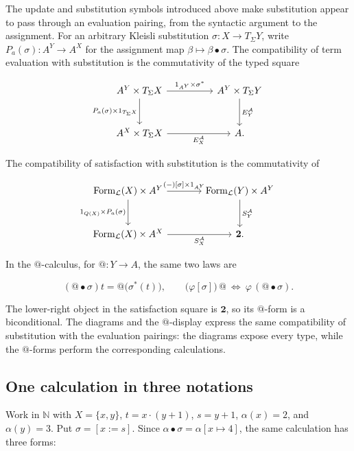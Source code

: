 \documentclass[11pt]{article}
\makeatletter
\newcommand{\atsign}{\mathord{@}}
\makeatother
\begin{document}
The update and substitution symbols introduced above make substitution appear
to pass through an evaluation pairing, from the syntactic argument to the
assignment. For an arbitrary Kleisli substitution
$\sigma:X\to T_\Sigma Y$, write
$P_a(\sigma):A^Y\to A^X$ for the assignment map
$\beta\mapsto\beta\bullet\sigma$. The compatibility of term evaluation with
substitution is the commutativity of the typed square

\[
\begin{tikzcd}[row sep=large,column sep=huge]
A^Y\times T_\Sigma X
  \arrow[r,"1_{A^Y}\times\sigma^*"]
  \arrow[d,"P_a(\sigma)\times1_{T_\Sigma X}"'] &
A^Y\times T_\Sigma Y \arrow[d,"E_Y^{\mathcal A}"] \\
A^X\times T_\Sigma X \arrow[r,"E_X^{\mathcal A}"'] & A.
\end{tikzcd}
\]

The compatibility of satisfaction with substitution is the commutativity of

\[
\begin{tikzcd}[row sep=large,column sep=large]
\operatorname{Form}_{\mathcal L}(X)\times A^Y
  \arrow[r,"{(-)[\sigma]\times1_{A^Y}}"]
  \arrow[d,"1_{Q(X)}\times P_a(\sigma)"'] &
\operatorname{Form}_{\mathcal L}(Y)\times A^Y
  \arrow[d,"S_Y^{\mathcal A}"] \\
\operatorname{Form}_{\mathcal L}(X)\times A^X
  \arrow[r,"S_X^{\mathcal A}"'] & \mathbf 2.
\end{tikzcd}
\]

In the $\atsign$-calculus, for \(\atsign:Y\to A\), the same two laws are

\[
(\atsign\bullet\sigma)t
=\atsign\bigl(\sigma^*(t)\bigr),
\qquad
\bigl(\varphi[\sigma]\bigr)\,\atsign
\ \Longleftrightarrow\ 
\varphi\,(\atsign\bullet\sigma).
\]

The lower-right object in the satisfaction square is \(\mathbf 2\), so its
$\atsign$-form is a biconditional. The diagrams and the $\atsign$-display
express the same compatibility of substitution with the evaluation pairings:
the diagrams expose every type, while the $\atsign$-forms perform the
corresponding calculations.

\subsection{One calculation in three notations}

Work in \(\mathbb N\) with \(X=\{x,y\}\), \(t=x\cdot(y+1)\),
\(s=y+1\), \(\alpha(x)=2\), and \(\alpha(y)=3\). Put
\(\sigma=[x:=s]\). Since \(\alpha\bullet\sigma=\alpha[x\mapsto4]\), the
same calculation has three forms:
\end{document}

